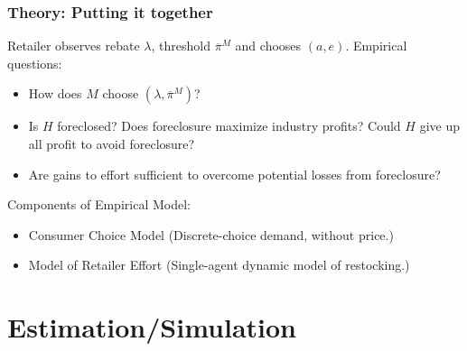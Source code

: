 \documentclass[aspectratio=169,11pt]{beamer}
\begin{document}
\begin{frame}
\frametitle{Theory: Putting it together}
\small
Retailer observes rebate $\lambda$, threshold $\overline{\pi}^M$ and chooses $(a,e)$.
\vfill
Empirical questions:
\begin{itemize}
\item How does $M$ choose $(\lambda,\overline{\pi}^M)$?
\item Is $H$ foreclosed? Does foreclosure maximize industry profits? Could $H$ give up all profit to avoid foreclosure?
\item Are gains to effort sufficient to overcome potential losses from foreclosure?
\end{itemize}
Components of Empirical Model:
\begin{itemize}
\item Consumer Choice Model (Discrete-choice demand, without price.)
\item Model of Retailer Effort (Single-agent dynamic model of restocking.)
\end{itemize}
\end{frame}



\section{Estimation/Simulation}
\end{document}
